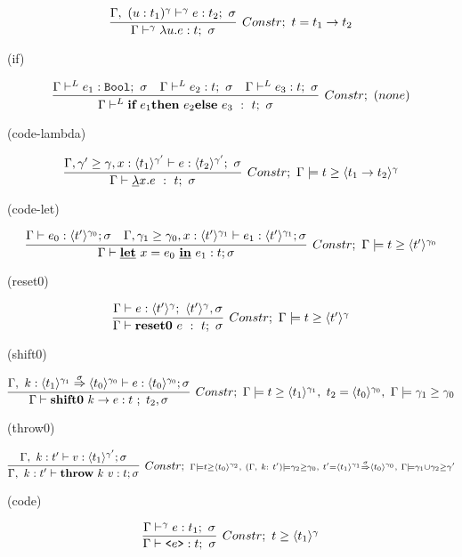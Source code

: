 \documentclass[dvipdfmx]{jsarticle}
\newcommand\longer[2]{{#1} \ord {#2}}
\newcommand\Bool{\mbox{\texttt{Bool}}}
\newcommand\uni{\cup} %
\begin{document}
\[
  \infer[Constr;~t=\funT{t_1}{t_2}{}]
  {\Gamma \vdash^\gamma \lambda u.e : t;~\sigma}
  {\Gamma,~(u:t_1)^\gamma \vdash^\gamma e : t_2;~\sigma}
\]

(if)

\[
  \infer[Constr;~(none)]
  {\Gamma \vdash^L
    \textbf{if}~e_1 \textbf{then}~e_2 \textbf{else}~e_3 ~:~t; ~ \sigma}
  {\Gamma \vdash^L e_1 : \Bool;~\sigma
    &\Gamma \vdash^L e_2 : t;~\sigma
    &\Gamma \vdash^L e_3 : t;~\sigma
  }
\]

(code-lambda)

\[
  \infer[Constr;~\Gamma \models \longer{t}{\codeT{t_1 \to t_2}{\gamma}}]
  {\Gamma \vdash \underline{\lambda}x.e ~:~t;~\sigma}
  {\Gamma,\longer{\gamma'}{\gamma},x:\codeT{t_1}{\gamma'}
    \vdash e : \codeT{t_2}{\gamma'};~\sigma
  }
\]

(code-let)

\[
  \infer[Constr;~\Gamma \models \longer{t}{\codeT{t'}{\gamma_0}}]
  {\Gamma \vdash \cLet~ x = e_0~ \cIn~ e_1 : t ; \sigma}
  { \Gamma \vdash e_0 : \codeT{t'}{\gamma_0} ; \sigma
    &\Gamma, \longer{\gamma_1}{\gamma_0}, x: \codeT{t'}{\gamma_1} \vdash e_1 : \codeT{t'}{\gamma_1} ; \sigma
  }
\]

(reset0)

\[
  \infer[Constr;~\Gamma \models \longer{t}{\codeT{t'}{\gamma}}]
  {\Gamma \vdash \Resetz~e ~:~ t; ~\sigma}
  {\Gamma \vdash e:\codeT{t'}{\gamma};~\codeT{t'}{\gamma},\sigma
  }
\]

(shift0)

\[
  \infer[Constr;~\Gamma \models \longer{t}{\codeT{t_1}{\gamma_1}},~ t_2 =\codeT{t_0}{\gamma_0},~ \Gamma \models \longer{\gamma_1}{\gamma_0}]
  {\Gamma \vdash \shiftz{k}{e} : t~;~ t_2,\sigma}
  {\Gamma,~k:\contT{\codeT{t_1}{\gamma_1}}{\codeT{t_0}{\gamma_0}}{\sigma}
    \vdash e : \codeT{t_0}{\gamma_0} ; \sigma
  }
\]


(throw0)

\[
  \infer[Constr;~ {\scriptstyle \Gamma \models \longer{t}{\codeT{t_0}{\gamma_2}},~ (\Gamma,~ k:~t') \models \gamma_2 \ord \gamma_0,~  t' = \contT{\codeT{t_1}{\gamma_1}}{\codeT{t_0}{\gamma_0}}{\sigma},~ \Gamma \models \gamma_1 \uni \gamma_2 \ord \gamma'}]
  {\Gamma,~ k:t'
    \vdash \throw{k}{v} : t ; \sigma}
  {\Gamma,~ k:t'
    \vdash v : \codeT{t_1}{\gamma'} ; \sigma
  }
\]

(code)

\[
  \infer[Constr;~\longer{t}{\codeT{t_1}{\gamma}}]
  {\Gamma \vdash \code{e} : t;~\sigma}
  {\Gamma \vdash^\gamma e : t_1;~\sigma}
\]
\end{document}
